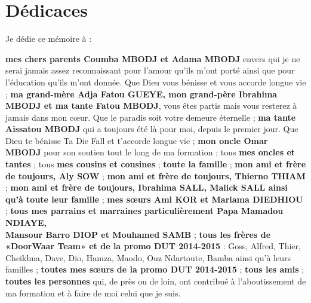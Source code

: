 %
%

\chapter*{Dédicaces}

Je dédie ce mémoire à : \\
\begin{itemize}
	\itemcheck \textbf{mes chers parents Coumba MBODJ et Adama MBODJ} envers qui je ne serai jamais assez reconnaissant pour l’amour qu’ils m’ont porté ainsi que pour l’éducation qu’ils m’ont donnée.  Que Dieu vous bénisse et vous accorde longue vie ;
	\itemcheck  \textbf{ma grand-mère Adja Fatou GUEYE, mon grand-père Ibrahima MBODJ et ma tante Fatou MBODJ}, vous êtes partis mais vous resterez à jamais dans mon cœur. Que le paradis soit votre demeure éternelle ;
	\itemcheck \textbf{ma tante Aissatou MBODJ} qui a toujours été là pour moi, depuis le premier jour. Que Dieu te bénisse Ta Die Fall et t'accorde longue vie ;
	\itemcheck \textbf{mon oncle Omar MBODJ} pour son soutien tout le long de ma formation ;
	\itemcheck tous \textbf{mes oncles et tantes} ;
	\itemcheck tous \textbf{mes cousins et cousines} ;
	\itemcheck \textbf{toute la famille} ;
	\itemcheck \textbf{mon ami et frère de toujours, Aly SOW} ;
	\itemcheck \textbf{mon ami et frère de toujours, Thierno THIAM} ;
	\itemcheck \textbf{mon ami et frère de toujours, Ibrahima SALL, Malick SALL ainsi qu'à toute leur famille} ;
	\itemcheck \textbf{ mes sœurs Ami KOR et Mariama DIEDHIOU} ;
	\itemcheck \textbf{tous mes parrains et marraines particulièrement Papa Mamadou NDIAYE,\\ Mansour Barro DIOP et Mouhamed SAMB} ;
	\itemcheck \textbf{tous les frères de «DoorWaar Team» et de la promo DUT 2014-2015} : Goss, Alfred, Thier, Cheikhna, Dave, Dio, Hamza, Maodo, Ouz Ndartoute, Bamba ainsi qu'à leurs familles ;
	\itemcheck \textbf{toutes mes sœurs de la promo DUT 2014-2015} ;
	\itemcheck \textbf{tous les amis} ;
	\itemcheck \textbf{toutes les personnes} qui, de près ou de loin, ont contribué à l’aboutissement de ma formation et à faire de moi celui que je suis.
\end{itemize}
\clearpage